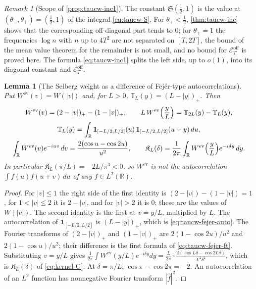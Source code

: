\documentclass[11pt,a4paper]{article}
\numberwithin{equation}{section}
\newtheorem{lemma}[theorem]{Lemma}
\theoremstyle{definition}
\theoremstyle{remark}
\newtheorem{remark}[theorem]{Remark}
\newcommand{\ind}{\mathbf 1}
\begin{document}
\begin{remark}[Scope of \cref{prop:taucw-inc1}]\label{rem:taucw-inc1}
The constant $\mathfrak S(\frac12,1)$ is the value at $(\theta_-,\theta_+)=(\frac12,1)$ of the integral \eqref{eq:taucw-S}. For $\theta_+<\frac12$, \cref{thm:taucw-inc} shows that the corresponding off-diagonal part tends to $0$; for $\theta_+=1$ the frequencies $\log n$ with $n$ up to $4T^2$ are not separated on $[T,2T]$, the bound of the mean value theorem for the remainder is not small, and no bound for $\mathscr E^{\mathrm{off}}_T$ is proved here. The formula \eqref{eq:taucw-inc1} splits the left side, up to $o(1)$, into its diagonal constant and $\mathscr E^{\mathrm{off}}_T$.
\end{remark}

\begin{lemma}[The Selberg weight as a difference of Fej\'er-type autocorrelations]\label{lem:taucw-fejer}
Put $W^{\mathrm{ev}}(v)=W(|v|)$ and, for $L>0$, $\mathbb T_L(y)=(L-|y|)_+$. Then
\begin{gather}
W^{\mathrm{ev}}(v)=(2-|v|)_+-(1-|v|)_+,\qquad L\,W^{\mathrm{ev}}\Bigl(\frac yL\Bigr)=\mathbb T_{2L}(y)-\mathbb T_L(y),\label{eq:taucw-fejer-W}\\
\mathbb T_L(y)=\int_{\mathbb R}\ind_{[-L/2,L/2]}(u)\,\ind_{[-L/2,L/2]}(u+y)\,du,\label{eq:taucw-fejer-auto}\\
\int_{\mathbb R}W^{\mathrm{ev}}(v)e^{-iuv}\,dv=\frac{2(\cos u-\cos2u)}{u^2},\qquad
\mathfrak K_L(\delta)=\frac1{2\pi}\int_{\mathbb R}W^{\mathrm{ev}}\Bigl(\frac yL\Bigr)e^{-i\delta y}\,dy .\label{eq:taucw-fejer-ft}
\end{gather}
In particular $\mathfrak K_L(\pi/L)=-2L/\pi^3<0$, so $W^{\mathrm{ev}}$ is not the autocorrelation $\int f(u)\overline{f(u+v)}\,du$ of any $f\in L^2(\mathbb R)$.
\end{lemma}
\begin{proof}
For $|v|\le1$ the right side of the first identity is $(2-|v|)-(1-|v|)=1$, for $1<|v|\le2$ it is $2-|v|$, and for $|v|>2$ it is $0$; these are the values of $W(|v|)$. The second identity is the first at $v=y/L$, multiplied by $L$. The autocorrelation of $\ind_{[-L/2,L/2]}$ is $(L-|y|)_+$, which is \eqref{eq:taucw-fejer-auto}. The Fourier transforms of $(2-|v|)_+$ and $(1-|v|)_+$ are $2(1-\cos2u)/u^2$ and $2(1-\cos u)/u^2$; their difference is the first formula of \eqref{eq:taucw-fejer-ft}. Substituting $v=y/L$ gives $\frac1{2\pi}\int W^{\mathrm{ev}}(y/L)e^{-i\delta y}dy=\frac{L}{2\pi}\cdot\frac{2(\cos L\delta-\cos2L\delta)}{L^2\delta^2}$, which is $\mathfrak K_L(\delta)$ of \eqref{eq:kernel-G}. At $\delta=\pi/L$, $\cos\pi-\cos2\pi=-2$. An autocorrelation of an $L^2$ function has nonnegative Fourier transform $|\hat f|^2$.
\end{proof}
\end{document}
